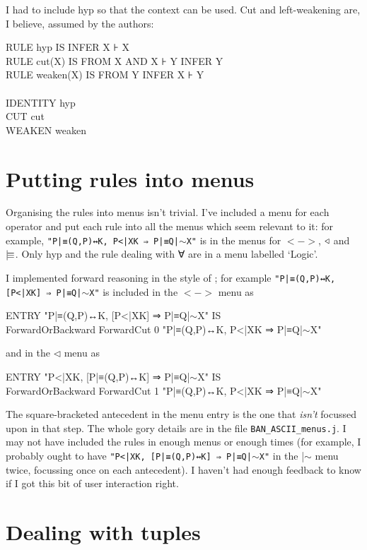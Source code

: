 I had to include hyp so that the context can be used. Cut and left-weakening are, I believe, assumed by the authors:
\begin{japeish}
RULE hyp IS INFER X ⊦ X\\
RULE cut(X) IS FROM X AND X ⊦ Y INFER Y\\
RULE weaken(X) IS FROM Y INFER X ⊦ Y\\
\\
IDENTITY hyp\\
CUT cut\\
WEAKEN weaken
\end{japeish}

\section{Putting rules into menus}

Organising the rules into menus isn't trivial. I've included a menu for each operator and put each rule into all the menus which seem relevant to it: for example, \texttt{"P|≡(Q,P)↔K, P<|{X}K ⇒ P|≡Q|$\sim$X"} is in the menus for $<->$, $\mathrel\triangleleft$ and $\believes$. Only hyp and the rule dealing with ∀ are in a menu labelled `Logic'.

I implemented forward reasoning in the style of ; for example \texttt{"P|≡(Q,P)↔K, [P<|{X}K] ⇒ P|≡Q|$\sim$X"} is included in the $<->$ menu as
\begin{japeish}
ENTRY "P|≡(Q,P)↔K, [P<|{X}K] ⇒ P|≡Q|$\sim$X" IS \\
\tab ForwardOrBackward ForwardCut 0 "P|≡(Q,P)↔K, P<|{X}K ⇒ P|≡Q|$\sim$X"
\end{japeish}
and in the $\triangleleft$ menu as
\begin{japeish}
ENTRY "P<|{X}K, [P|≡(Q,P)↔K] ⇒ P|≡Q|$\sim$X" IS \\
\tab ForwardOrBackward ForwardCut 1 "P|≡(Q,P)↔K, P<|{X}K ⇒ P|≡Q|$\sim$X"
\end{japeish}

The square-bracketed antecedent in the menu entry is the one that \emph{isn't} focussed upon in that step. The whole gory details are in the file \texttt{BAN\_ASCII\_menus.j}. I may not have included the rules in enough menus or enough times (for example, I probably ought to have \texttt{"P<|{X}K, [P|≡(Q,P)↔K] ⇒ P|≡Q|$\sim$X"} in the |$\sim$ menu twice, focussing once on each antecedent). I haven't had enough feedback to know if I got this bit of user interaction right.

\section{Dealing with tuples}

